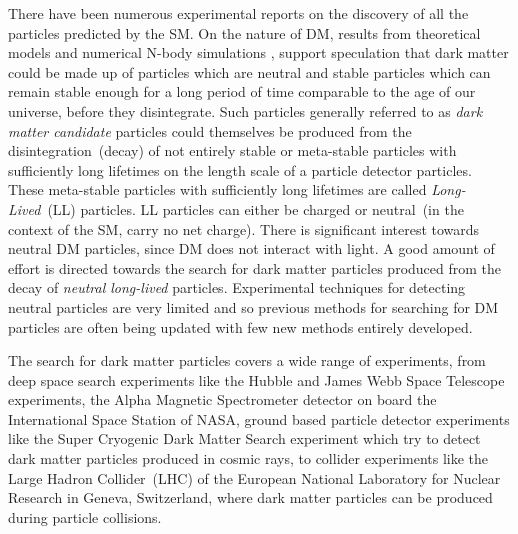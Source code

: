 \par
 There have been numerous experimental reports on the discovery of all the particles predicted by the SM.  On the nature of DM, results from theoretical models and numerical N-body simulations \cite{DMS}, support speculation that dark matter could be made up of particles which are neutral and stable \ie particles which can remain stable enough for a long period of time comparable to the age of our universe, before they disintegrate. Such particles generally referred to as \textit{dark matter candidate} particles could themselves be produced from the disintegration~(decay) of not entirely stable or meta-stable particles with sufficiently long lifetimes on the length scale of a particle detector  particles\cite{SUSYDM}. These meta-stable particles with sufficiently long lifetimes are called \textit{Long-Lived}~(LL) particles. LL particles can either be charged or neutral~(\ie in the context of the SM, carry no net charge). There is significant interest towards neutral DM particles, since DM does not interact with light. A good amount of effort is directed towards the search for dark matter particles produced from the decay of \textit{neutral long-lived} particles\cite{LSPDM}. Experimental techniques for detecting neutral particles are very limited and so previous methods for searching for DM particles are often being updated with few new methods entirely developed.  %
\par
   The search for dark matter particles covers a wide range of experiments, from deep space search experiments like the Hubble and James Webb Space Telescope experiments, the Alpha Magnetic Spectrometer detector on board the International Space Station of NASA, ground based particle detector experiments like the Super Cryogenic Dark Matter Search experiment which try to detect dark matter particles produced in cosmic rays, to collider experiments like the Large Hadron Collider~(LHC) of the European National Laboratory for Nuclear Research in Geneva, Switzerland, where dark matter particles can be produced during particle collisions.
